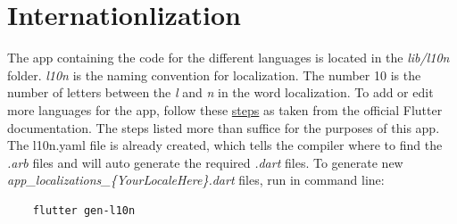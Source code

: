 \documentclass[a4paper]{scrreprt}
\begin{document}
\section{Internationlization}
The app containing the code for the different languages is located in the \textit{lib/l10n} folder. \textit{l10n} is the naming convention for localization. The number 10 is the number of letters
between the \textit{l} and \textit{n} in the word localization.
\newline
\newline
To add or edit more languages for the app, follow these \href{https://docs.flutter.dev/accessibility-and-localization/internationalization}{steps} as taken from the official Flutter documentation.
\newline
The steps listed more than suffice for the purposes of this app.
The l10n.yaml file is already created, which tells the compiler where to find the \textit{.arb} files and will auto generate the required \textit{.dart} files.
\newline
\newline
To generate new \textit{app_localizations_\{YourLocaleHere\}.dart} files, run in command line:
\begin{verbatim}
    flutter gen-l10n
\end{verbatim}
\end{document}
